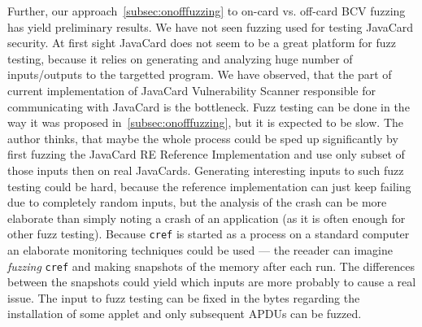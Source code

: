         Further, our approach~\ref{subsec:onofffuzzing} to on-card vs. off-card BCV fuzzing has yield preliminary results. We have not seen fuzzing used for testing JavaCard security. At first sight JavaCard does not seem to be a great platform for fuzz testing, because it relies on generating and analyzing huge number of inputs/outputs to the targetted program. We have observed, that the part of current implementation of JavaCard Vulnerability Scanner responsible for communicating with JavaCard is the bottleneck. Fuzz testing can be done in the way it was proposed in~\ref{subsec:onofffuzzing}, but it is expected to be slow. The author thinks, that maybe the whole process could be sped up significantly by first fuzzing the JavaCard RE Reference Implementation and use only subset of those inputs then on real JavaCards. Generating interesting inputs to such fuzz testing could be hard, because the reference implementation can just keep failing due to completely random inputs, but the analysis of the crash can be more elaborate than simply noting a crash of an application (as it is often enough for other fuzz testing). Because \texttt{cref} is started as a process on a standard computer an elaborate monitoring techniques could be used --- the reeader can imagine \textit{fuzzing} \texttt{cref} and making snapshots of the memory after each run. The differences between the snapshots could yield which inputs are more probably to cause a real issue. The input to fuzz testing can be fixed in the bytes regarding the installation of some applet and only subsequent APDUs can be fuzzed.         %

